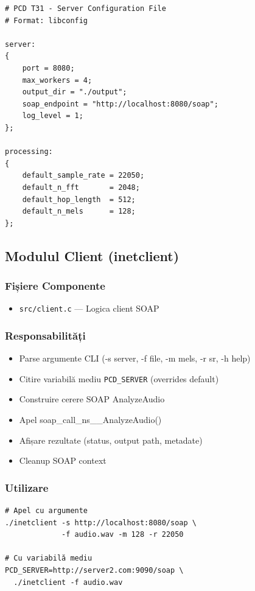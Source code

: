 \documentclass[12pt,a4paper,twoside]{article}
\begin{document}
\begin{lstlisting}
# PCD T31 - Server Configuration File
# Format: libconfig

server:
{
    port = 8080;
    max_workers = 4;
    output_dir = "./output";
    soap_endpoint = "http://localhost:8080/soap";
    log_level = 1;
};

processing:
{
    default_sample_rate = 22050;
    default_n_fft       = 2048;
    default_hop_length  = 512;
    default_n_mels      = 128;
};
\end{lstlisting}

\subsection{Modulul Client (inetclient)}

\subsubsection{Fișiere Componente}
\begin{itemize}
    \item \texttt{src/client.c} --- Logica client SOAP
\end{itemize}

\subsubsection{Responsabilități}

\begin{itemize}
    \item Parse argumente CLI (-s server, -f file, -m mels, -r sr, -h help)
    \item Citire variabilă mediu \texttt{PCD\_SERVER} (overrides default)
    \item Construire cerere SOAP AnalyzeAudio
    \item Apel soap\_call\_ns\_\_AnalyzeAudio()
    \item Afișare rezultate (status, output path, metadate)
    \item Cleanup SOAP context
\end{itemize}

\subsubsection{Utilizare}

\begin{lstlisting}
# Apel cu argumente
./inetclient -s http://localhost:8080/soap \
             -f audio.wav -m 128 -r 22050

# Cu variabilă mediu
PCD_SERVER=http://server2.com:9090/soap \
  ./inetclient -f audio.wav
\end{lstlisting}
\end{document}
